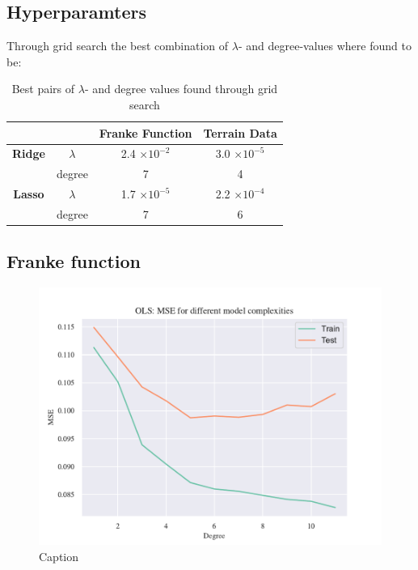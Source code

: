 
\subsection{Hyperparamters}

Through grid search the best combination of $\lambda$- and degree-values where found to be: 

\begin{table}[h!]
    \centering
    \begin{tabular}{|c|c|c|c|}
        \hline
        & & \textbf{Franke Function} & \textbf{Terrain Data} \\ \hline
        \textbf{Ridge} & $\lambda$ & 2.4 $\times 10^{-2}$ & 3.0 $\times 10^{-5}$ \\ 
         & degree & 7 & 4 \\ \hline
        \textbf{Lasso} & $\lambda$ & 1.7 $\times 10^{-5}$ & 2.2 $\times 10^{-4}$ \\ 
         & degree & 7 & 6 \\ \hline
    \end{tabular}
    \caption{Best pairs of $\lambda$- and degree values found through grid search}
    \label{tab:my_label}
\end{table}

\subsection{Franke function}

\begin{figure}[h!]
    \centering
    \includegraphics[width=1\linewidth]{project_1_alt/figures/figures_in_report/OLS_MSE_Franke_Noise.pdf}
    \caption{Caption}
    \label{fig:mseols}
\end{figure}

